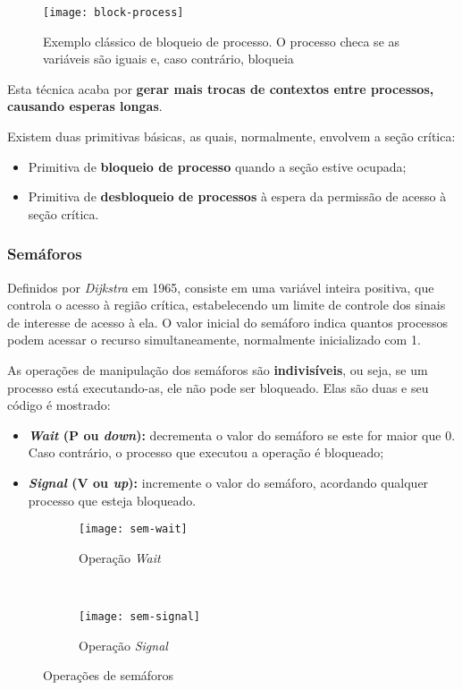 \begin{figure}[ht]
  \centering
  \texttt{[image: block-process]}
  \caption{Exemplo clássico de bloqueio de processo. O processo checa se as variáveis são iguais e, caso contrário, bloqueia}
  \label{fig:block-process}
\end{figure}

Esta técnica acaba por \textbf{gerar mais trocas de contextos entre processos, causando esperas longas}.

Existem duas primitivas básicas, as quais, normalmente, envolvem a seção crítica:

\begin{itemize}
  \item Primitiva de \textbf{bloqueio de processo} quando a seção estive ocupada;

  \item Primitiva de \textbf{desbloqueio de processos} à espera da permissão de acesso à seção crítica.
\end{itemize}





\subsubsection{Semáforos}
Definidos por \textit{Dijkstra} em 1965, consiste em uma variável inteira positiva, que controla o acesso à região crítica, estabelecendo um limite de controle dos sinais de interesse de acesso à ela. O valor inicial do semáforo indica quantos processos podem acessar o recurso simultaneamente, normalmente inicializado com 1.

As operações de manipulação dos semáforos são \textbf{indivisíveis}, ou seja, se um processo está executando-as, ele não pode ser bloqueado. Elas são duas e seu código é mostrado:

\begin{itemize}
  \item \textbf{\textit{Wait} (P ou \textit{down}):} decrementa o valor do semáforo se este for maior que 0. Caso contrário, o processo que executou a operação é bloqueado;

  \item \textbf{\textit{Signal} (V ou \textit{up}):} incremente o valor do semáforo, acordando qualquer processo que esteja bloqueado.
\end{itemize}

\begin{figure*}[ht]

  \begin{subfigure}[t]{.5\textwidth}
    \centering
    \texttt{[image: sem-wait]}
    \caption{Operação \textit{Wait}}
    \label{subfig:sem-wait}
  \end{subfigure}
  ~
  \begin{subfigure}[t]{.5\textwidth}
    \centering
    \texttt{[image: sem-signal]}
    \caption{Operação \textit{Signal}}
    \label{subfig:sem-wait}
  \end{subfigure}

  \caption{Operações de semáforos}
  \label{fig:sem-ops}
\end{figure*}

